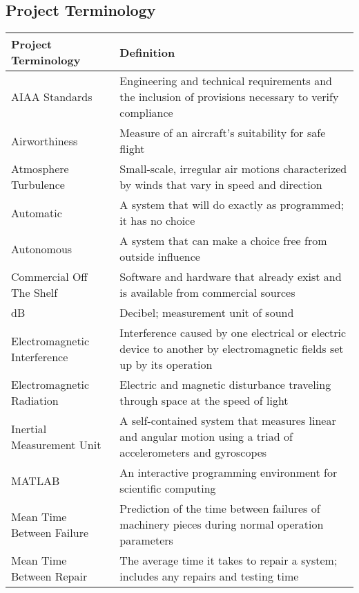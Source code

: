 \documentclass[
	letterpaper, %
	12pt, %
]{CSSullivanBusinessReport}
\begin{document}
\begin{appendices}

\section{Project Terminology}
    \label{app:project_terms}
    \begin{longtable}{| p{6cm} | p{11cm} |}
        \hline
        \textbf{Project Terminology} & \textbf{Definition} \\
        \hline
        AIAA Standards & Engineering and technical requirements and the inclusion of provisions necessary to verify compliance \\
        \hline
        Airworthiness & Measure of an aircraft's suitability for safe flight \\
        \hline
        Atmosphere Turbulence & Small-scale, irregular air motions characterized by winds that vary in speed and direction \\
        \hline
        Automatic & A system that will do exactly as programmed; it has no choice \\
        \hline
        Autonomous & A system that can make a choice free from outside influence \\
        \hline
        Commercial Off The Shelf & Software and hardware that already exist and is available from commercial sources \\
        \hline
        dB & Decibel; measurement unit of sound \\
        \hline
        Electromagnetic Interference & Interference caused by one electrical or electric device to another by electromagnetic fields set up by its operation \\
        \hline
        Electromagnetic Radiation & Electric and magnetic disturbance traveling through space at the speed of light \\
        \hline
        Inertial Measurement Unit & A self-contained system that measures linear and angular motion using a triad of accelerometers and gyroscopes \\
        \hline
        MATLAB & An interactive programming environment for scientific computing \\
        \hline
        Mean Time Between Failure & Prediction of the time between failures of machinery pieces during normal operation parameters \\
        \hline
        Mean Time Between Repair & The average time it takes to repair a system; includes any repairs and testing time \\

\end{longtable}
\end{appendices}
\end{document}
